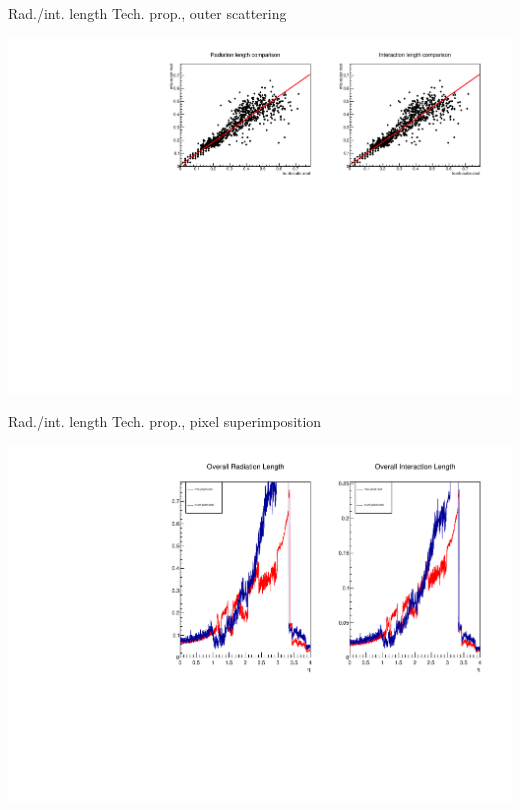 \documentclass[pdftex, 11pt]{beamer}
\begin{document}
\begin{frame}{Rad./int. length Tech. prop., outer scattering}
  \begin{center}
    \includegraphics[width=\textwidth]{img/outer-scattering.pdf}
  \end{center}
\end{frame}

\begin{frame}{Rad./int. length Tech. prop., pixel superimposition}
  \begin{center}
    \includegraphics[width=\textwidth]{img/pixel-superimposition.pdf}
  \end{center}
\end{frame}
\end{document}
